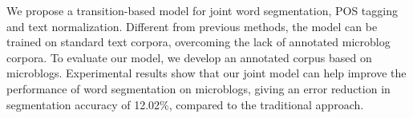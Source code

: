 We propose a transition-based model for joint word segmentation, POS tagging and text normalization. Different from previous methods, the model can be trained on standard text corpora, overcoming the lack of annotated microblog corpora. To evaluate our model, we develop an annotated corpus based on microblogs. Experimental results show that our joint model can help improve the performance of word segmentation on microblogs, giving an error reduction in segmentation accuracy of 12.02\%, compared to the traditional approach.

